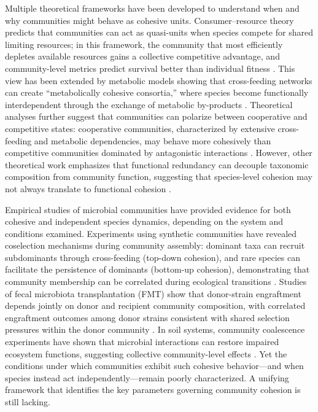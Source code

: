 Multiple theoretical frameworks have been developed to understand when and why communities might behave as cohesive units. Consumer--resource theory predicts that communities can act as quasi-units when species compete for shared limiting resources; in this framework, the community that most efficiently depletes available resources gains a collective competitive advantage, and community-level metrics predict survival better than individual fitness \citep{Tikhonov2016, Marsland2020}. This view has been extended by metabolic models showing that cross-feeding networks can create ``metabolically cohesive consortia,'' where species become functionally interdependent through the exchange of metabolic by-products \citep{Zelezniak2015, Goldford2018}. Theoretical analyses further suggest that communities can polarize between cooperative and competitive states: cooperative communities, characterized by extensive cross-feeding and metabolic dependencies, may behave more cohesively than competitive communities dominated by antagonistic interactions \citep{Coyte2021}. However, other theoretical work emphasizes that functional redundancy can decouple taxonomic composition from community function, suggesting that species-level cohesion may not always translate to functional cohesion \citep{Louca2018}.

Empirical studies of microbial communities have provided evidence for both cohesive and independent species dynamics, depending on the system and conditions examined. Experiments using synthetic communities have revealed coselection mechanisms during community assembly: dominant taxa can recruit subdominants through cross-feeding (top-down cohesion), and rare species can facilitate the persistence of dominants (bottom-up cohesion), demonstrating that community membership can be correlated during ecological transitions \citep{DiazColunga2022}. Studies of fecal microbiota transplantation (FMT) show that donor-strain engraftment depends jointly on donor and recipient community composition, with correlated engraftment outcomes among donor strains consistent with shared selection pressures within the donor community \citep{Smillie2018, Ianiro2022}. In soil systems, community coalescence experiments have shown that microbial interactions can restore impaired ecosystem functions, suggesting collective community-level effects \citep{Calderon2023}. Yet the conditions under which communities exhibit such cohesive behavior---and when species instead act independently---remain poorly characterized. A unifying framework that identifies the key parameters governing community cohesion is still lacking.

